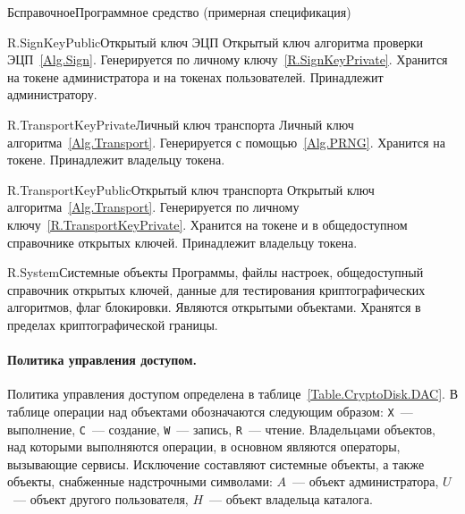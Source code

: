 \begin{appendix}{Б}{справочное}{Программное средство \CryptoDisk 
(примерная спецификация)}
\begin{definition}{R.SignKeyPublic}{Открытый ключ ЭЦП}
Открытый ключ алгоритма проверки ЭЦП~\ref{Alg.Sign}.
Генерируется по личному ключу~\ref{R.SignKeyPrivate}.
Хранится на токене администратора и на токенах пользователей. 
Принадлежит администратору.
\end{definition}

\begin{definition}{R.TransportKeyPrivate}{Личный ключ транспорта}
Личный ключ алгоритма~\ref{Alg.Transport}.
Генерируется с помощью~\ref{Alg.PRNG}.
Хранится на токене. Принадлежит владельцу токена.
\end{definition}

\begin{definition}{R.TransportKeyPublic}{Открытый ключ транспорта}
Открытый ключ алгоритма~\ref{Alg.Transport}.
Генерируется по личному ключу~\ref{R.TransportKeyPrivate}.
Хранится на токене и в общедоступном справочнике открытых ключей. 
Принадлежит владельцу токена.
\end{definition}

\begin{definition}{R.System}{Системные объекты}
Программы, файлы настроек, общедоступный справочник открытых ключей,
данные для тестирования криптографических алгоритмов, флаг блокировки.
Являются открытыми объектами.
Хранятся в пределах криптографической границы.
\end{definition}

\paragraph*{Политика управления доступом.} 
Политика управления доступом определена в таблице~\ref{Table.CryptoDisk.DAC}.
В таблице операции над объектами обозначаются следующим образом:
\texttt{X}~--- выполнение,
\texttt{C}~--- создание,
\texttt{W}~--- запись,
\texttt{R}~--- чтение.
%
Владельцами объектов, над которыми выполняются операции,
в основном являются операторы, вызывающие сервисы. 
%
Исключение составляют системные объекты, а также объекты, 
снабженные надстрочными символами:
$A$~--- объект администратора, $U$~--- объект другого пользователя, 
$H$~--- объект владельца каталога.


\end{appendix}
